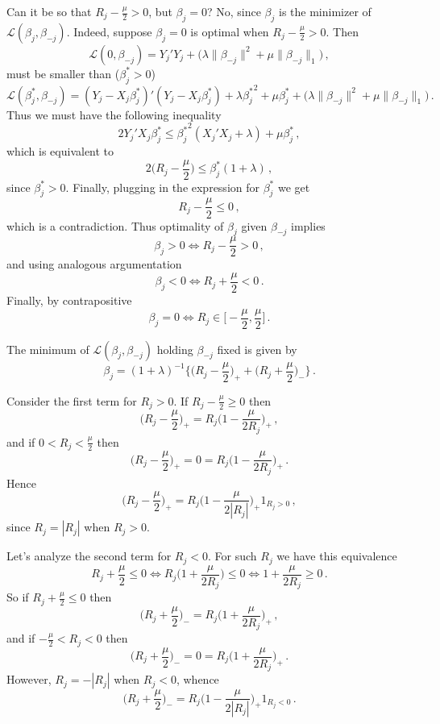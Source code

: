 \documentclass[a4paper,12pt]{extarticle}
\begin{document}
Can it be so that $R_j - \frac{\mu}{2} > 0$, but $\beta_j = 0$? No, since $\beta_j$
is the minimizer of $\mathcal{L} (\beta_j, \beta_{-j})$. Indeed, suppose $\beta_j=0$
is optimal when $R_j - \frac{\mu}{2} > 0$. Then
$$ \mathcal{L} (0, \beta_{-j})
    = Y_j'Y_j + \bigl(\lambda \|\beta_{-j} \|^2 + \mu \|\beta_{-j} \|_1\bigr) \,, $$
must be smaller than ($\beta_j^*>0$)
$$ \mathcal{L} (\beta_j^*, \beta_{-j})
    = (Y_j - X_j\beta_j^*)'(Y_j - X_j\beta_j^*)
      + \lambda {\beta_j^*}^2 + \mu \beta_j^*
      + \bigl(\lambda \|\beta_{-j} \|^2 + \mu \|\beta_{-j} \|_1\bigr) \,. $$
Thus we must have the following inequality
$$ 2 Y_j'X_j\beta_j^* \leq {\beta_j^*}^2 (X_j'X_j + \lambda) + \mu \beta_j^* \,, $$
which is equivalent to
$$ 2 \biggl(R_j - \frac{\mu}{2}\biggr) \leq \beta_j^* (1 + \lambda) \,, $$
since $\beta_j^*>0$.
Finally, plugging in the expression for $\beta_j^*$ we get
$$ R_j - \frac{\mu}{2} \leq 0 \,, $$
which is a contradiction. Thus optimality of $\beta_j$ given $\beta_{-j}$ implies
$$ \beta_j > 0 \Leftrightarrow R_j - \frac{\mu}{2} > 0 \,, $$
and using analogous argumentation
$$ \beta_j < 0 \Leftrightarrow R_j + \frac{\mu}{2} < 0 \,. $$
Finally, by contrapositive
$$ \beta_j = 0 \Leftrightarrow R_j \in\biggl[-\frac{\mu}{2}, \frac{\mu}{2}\biggr] \,. $$

The minimum of $\mathcal{L} (\beta_j, \beta_{-j})$ holding $\beta_{-j}$ fixed is
given by
$$ \beta_j
  = (1+\lambda)^{-1} \biggl\{
      \biggl(R_j - \frac{\mu}{2}\biggr)_+ + \biggl(R_j + \frac{\mu}{2}\biggr)_-
    \biggr\}
  \,.$$

\noindent Consider the first term for $R_j > 0$. If $R_j - \frac{\mu}{2} \geq 0$ then
$$ \biggl(R_j - \frac{\mu}{2}\biggr)_+
  = R_j \biggl( 1 - \frac{\mu}{2R_j}\biggr)_+ \,, $$
and if $0 < R_j < \frac{\mu}{2}$ then
$$ \biggl(R_j - \frac{\mu}{2}\biggr)_+
  = 0 = R_j \biggl( 1 - \frac{\mu}{2R_j}\biggr)_+ \,. $$
Hence
$$ \biggl(R_j - \frac{\mu}{2}\biggr)_+
  = R_j \biggl( 1 - \frac{\mu}{2|R_j|}\biggr)_+ 1_{R_j>0} \,, $$
since $R_j = |R_j|$ when $R_j>0$.

\noindent Let's analyze the second term for $R_j < 0$. For such $R_j$ we have this equivalence
$$ R_j + \frac{\mu}{2} \leq 0
  \Leftrightarrow R_j \biggl( 1 + \frac{\mu}{2R_j}\biggr) \leq 0
  \Leftrightarrow 1 + \frac{\mu}{2R_j} \geq 0
  \,. $$
So if $R_j + \frac{\mu}{2} \leq 0$ then
$$ \biggl(R_j + \frac{\mu}{2}\biggr)_-
  = R_j \biggl( 1 + \frac{\mu}{2R_j}\biggr)_+ \,, $$
and if $- \frac{\mu}{2} < R_j < 0$ then
$$ \biggl(R_j + \frac{\mu}{2}\biggr)_-
  = 0 = R_j \biggl( 1 + \frac{\mu}{2R_j}\biggr)_+ \,. $$
However, $R_j = -|R_j|$ when $R_j<0$, whence
$$ \biggl(R_j + \frac{\mu}{2}\biggr)_-
  = R_j \biggl( 1 - \frac{\mu}{2|R_j|}\biggr)_+ 1_{R_j<0} \,. $$
\end{document}
